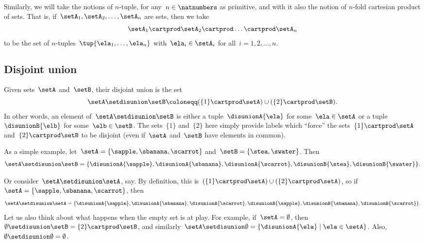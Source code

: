 Similarly, we will take the notions of $n$-tuple, for any~$n \in \natnumbers$ as primitive, and with it also the notion of $n$-fold cartesian product of sets.
That is, if~$\setA_1, \setA_2, \ldots, \setA_n$ are sets, then we take
\begin{equation*}
    \setA_1 \cartprod \setA_2 \cartprod \dots \cartprod \setA_n
\end{equation*}
to be the set of $n$-tuples~$\tup{\ela_1, \ldots, \ela_n}$ with~$\ela_i \in \setA_i$ for all~$i = 1,2,\ldots,n$.

\subsection{Disjoint union}
\label{sec:disjoint-union}

Given sets~$\setA$ and~$\setB$, their disjoint union is the set
\begin{equation*}
    \setA \setdisunion \setB \coloneqq (  \{ 1 \} \cartprod \setA) \cup ( \{2\}  \cartprod \setB).
\end{equation*}
In other words, an element of~$\setA \setdisunion \setB$ is either a tuple~$\disunionA{\ela}$ for some~$\ela \in \setA$ or a tuple $\disunionB{\elb}$ for some~$\elb \in \setB$.
The sets~$\{ 1 \}$ and~$\{2\}$ here simply provide labels which ``force'' the sets~$\{ 1 \}  \cartprod \setA$ and~$ \{2\}  \cartprod \setB$ to be disjoint (even if~$\setA$ and~$\setB$ have elements in common).

As a simple example, let~$\setA = \{ \sapple, \sbanana, \scarrot\}$ and~$\setB = \{ \stea, \swater \}$.
Then
\begin{equation*}
    \setA \setdisunion \setB = \{ \disunionA{\sapple}, \disunionA{\sbanana}, \disunionA{\scarrot}, \disunionB{\stea},  \disunionB{\swater}\}.
\end{equation*}

Or consider~$\setA \setdisunion \setA$, say.
By definition, this is~$(\{ 1 \} \cartprod \setA) \cup (\{2\} \cartprod \setA)$, so if~$\setA = \{ \sapple, \sbanana, \scarrot\}$, then
\begin{equation*}
    \setA \setdisunion \setA = \{ \disunionA{\sapple}, \disunionA{\sbanana}, \disunionA{\scarrot}, \disunionB{\sapple}, \disunionB{\sbanana}, \disunionB{\scarrot} \}.
\end{equation*}
Let us also think about what happens when the empty set is at play.
For example, if~$\setA = \emptyset$, then~$\emptyset \setdisunion \setB =  \{2\} \cartprod \setB$, and similarly~$\setA \setdisunion \emptyset =  \{ \disunionA{\ela} \mid \ela \in \setA \}$.
Also,~$\emptyset \setdisunion \emptyset = \emptyset$.

